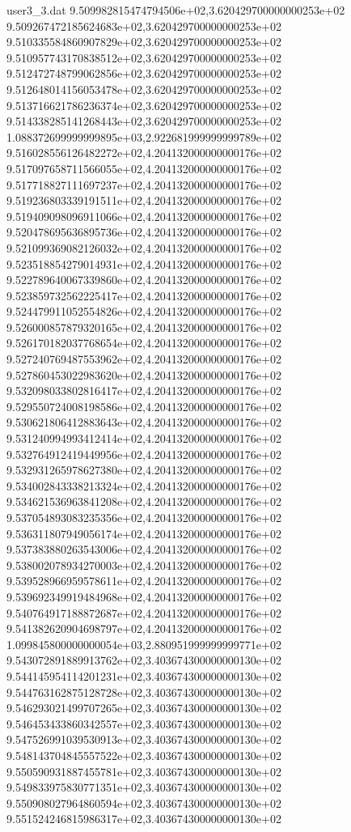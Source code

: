 \begin{filecontents}{user3_3.dat}
9.509982815474794506e+02,3.620429700000000253e+02
9.509267472185624683e+02,3.620429700000000253e+02
9.510335584860907829e+02,3.620429700000000253e+02
9.510957743170838512e+02,3.620429700000000253e+02
9.512472748799062856e+02,3.620429700000000253e+02
9.512648014156053478e+02,3.620429700000000253e+02
9.513716621786236374e+02,3.620429700000000253e+02
9.514338285141268443e+02,3.620429700000000253e+02
1.088372699999999895e+03,2.922681999999999789e+02
9.516028556126482272e+02,4.204132000000000176e+02
9.517097658711566055e+02,4.204132000000000176e+02
9.517718827111697237e+02,4.204132000000000176e+02
9.519236803339191511e+02,4.204132000000000176e+02
9.519409098096911066e+02,4.204132000000000176e+02
9.520478695636895736e+02,4.204132000000000176e+02
9.521099369082126032e+02,4.204132000000000176e+02
9.523518854279014931e+02,4.204132000000000176e+02
9.522789640067339860e+02,4.204132000000000176e+02
9.523859732562225417e+02,4.204132000000000176e+02
9.524479911052554826e+02,4.204132000000000176e+02
9.526000857879320165e+02,4.204132000000000176e+02
9.526170182037768654e+02,4.204132000000000176e+02
9.527240769487553962e+02,4.204132000000000176e+02
9.527860453022983620e+02,4.204132000000000176e+02
9.532098033802816417e+02,4.204132000000000176e+02
9.529550724008198586e+02,4.204132000000000176e+02
9.530621806412883643e+02,4.204132000000000176e+02
9.531240994993412414e+02,4.204132000000000176e+02
9.532764912419449956e+02,4.204132000000000176e+02
9.532931265978627380e+02,4.204132000000000176e+02
9.534002843338213324e+02,4.204132000000000176e+02
9.534621536963841208e+02,4.204132000000000176e+02
9.537054893083235356e+02,4.204132000000000176e+02
9.536311807949056174e+02,4.204132000000000176e+02
9.537383880263543006e+02,4.204132000000000176e+02
9.538002078934270003e+02,4.204132000000000176e+02
9.539528966959578611e+02,4.204132000000000176e+02
9.539692349919484968e+02,4.204132000000000176e+02
9.540764917188872687e+02,4.204132000000000176e+02
9.541382620904698797e+02,4.204132000000000176e+02
1.099845800000000054e+03,2.880951999999999771e+02
9.543072891889913762e+02,3.403674300000000130e+02
9.544145954114201231e+02,3.403674300000000130e+02
9.544763162875128728e+02,3.403674300000000130e+02
9.546293021499707265e+02,3.403674300000000130e+02
9.546453433860342557e+02,3.403674300000000130e+02
9.547526991039530913e+02,3.403674300000000130e+02
9.548143704845557522e+02,3.403674300000000130e+02
9.550590931887455781e+02,3.403674300000000130e+02
9.549833975830771351e+02,3.403674300000000130e+02
9.550908027964860594e+02,3.403674300000000130e+02
9.551524246815986317e+02,3.403674300000000130e+02

\end{filecontents}
